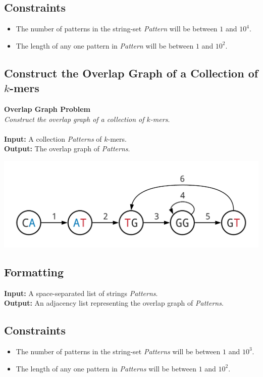 \documentclass{article}
\begin{document}
\subsection*{Constraints}
\begin{itemize}
    \item The number of patterns in the string-set \emph{Pattern} will be between $1$ and $10^4$.
    \item The length of any one pattern in \emph{Pattern} will be between $1$ and $10^2$.
\end{itemize}
\pagebreak

\subsection{Construct the Overlap Graph of a Collection of $k$-mers}
\hline\vspace{5}
\textbf{Overlap Graph Problem}\\
\emph{Construct the overlap graph of a collection of $k$-mers}.\\ \\
\textbf{Input:} A collection \emph{Patterns} of $k$-mers.\\
\textbf{Output:} The overlap graph of \emph{Patterns}.
\begin{center}
    \includegraphics[scale=0.24]{c3/logos/3C.png}
\end{center}
\hline\vspace{5}

\subsection*{Formatting}
\noindent\textbf{Input:} A space-separated list of strings \emph{Patterns}.\\
\noindent\textbf{Output:} An adjacency list representing the overlap graph of \emph{Patterns}.

\subsection*{Constraints}
\begin{itemize}
    \item The number of patterns in the string-set \emph{Patterns} will be between $1$ and $10^3$.
    \item The length of any one pattern in \emph{Patterns} will be between $1$ and $10^2$.
\end{itemize}
\pagebreak
\end{document}
